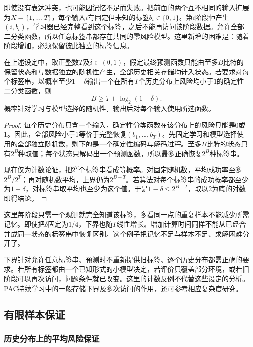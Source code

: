 即使没有表达冲突，也可能因记忆不足而失败。把前面的两个互不相同的输入扩展为$X=\{1,\ldots,T\}$，每个输入$i$有固定但未知的标签$b_i\in\{0,1\}$。第$i$阶段恒产生$(i,b_i)$，学习器已经完整看到这个标签，之后不能再访问该阶段数据。允许全部二分类函数，所以任意标签串都存在共同的零风险模型。这里新增的困难是：随着阶段增加，必须保留彼此独立的标签信息。

\begin{theorem}[逐历史分布保持的信息下界]
\label{thm:continual-memory-example}
在上述设定中，取正整数$T$及$\delta\in(0,1)$，假定最终预测函数只能由至多$B$比特的保留状态和与数据独立的随机性产生，全部历史相关存储均计入状态。若要求对每个标签串，以概率至少$1-\delta$输出一个在所有$T$个历史分布上风险均小于1的确定性二分类函数，则
\[
 B\geq T+\log_2(1-\delta).
\]
概率针对学习与模型选择的随机性，输出后对每个输入使用所选函数。
\end{theorem}
\begin{proof}
每个历史分布只含一个输入，确定性分类函数在该分布上的风险只能是0或1。因此，全部风险小于1等价于完整恢复$(b_1,\ldots,b_T)$。先固定学习和模型选择使用的全部独立随机数，剩下的是一个确定性编码与解码过程。至多$B$比特的状态只有$2^B$种取值；每个状态只解码出一个预测函数，所以最多正确恢复$2^B$种标签串。

现在仅为计数论证，把$2^T$个标签串看成等概率。对固定随机数，平均成功率至多$2^B/2^T$；再对随机数平均，上界仍为$2^{B-T}$。若算法对每个标签串的成功概率都至少为$1-\delta$，对标签串取平均也至少为这个值。于是$1-\delta\leq2^{B-T}$，取以2为底的对数即得结论。
\end{proof}

这里每阶段只需一个观测就完全知道该标签，多看同一点的重复样本不能减少所需记忆。即使把$\delta$固定为$1/4$，下界也随$T$线性增长。增加计算时间同样不能从已经合并成同一状态的标签串中恢复区别。这个例子把记忆不足与样本不足、求解困难分开了。

下界针对允许任意标签串、预测时不重新提供旧标签、逐个历史分布都需正确的要求。若所有标签都由一个已知形式的小模型决定，若评价只覆盖部分环境，或若旧阶段可以再次访问，问题条件就已改变。这里的计数反例不代替这些设定的分析。PAC持续学习中的一般存储下界及多次访问的作用，还可参考相应复杂度研究。

\subsection{有限样本保证}

\subsubsection{历史分布上的平均风险保证}

